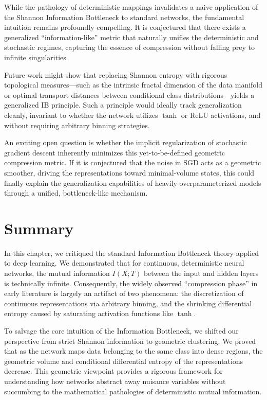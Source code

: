 \begin{horizon}
While the pathology of deterministic mappings invalidates a naive application of the Shannon Information Bottleneck to standard networks, the fundamental intuition remains profoundly compelling. It is conjectured that there exists a generalized ``information-like'' metric that naturally unifies the deterministic and stochastic regimes, capturing the essence of compression without falling prey to infinite singularities. 

Future work might show that replacing Shannon entropy with rigorous topological measures---such as the intrinsic fractal dimension of the data manifold or optimal transport distances between conditional class distributions---yields a generalized IB principle. Such a principle would ideally track generalization cleanly, invariant to whether the network utilizes $\tanh$ or ReLU activations, and without requiring arbitrary binning strategies.

An exciting open question is whether the implicit regularization of stochastic gradient descent inherently minimizes this yet-to-be-defined geometric compression metric. If it is conjectured that the noise in SGD acts as a geometric smoother, driving the representations toward minimal-volume states, this could finally explain the generalization capabilities of heavily overparameterized models through a unified, bottleneck-like mechanism.
\end{horizon}

\section{Summary}
In this chapter, we critiqued the standard Information Bottleneck theory applied to deep learning. We demonstrated that for continuous, deterministic neural networks, the mutual information $I(X; T)$ between the input and hidden layers is technically infinite. Consequently, the widely observed ``compression phase'' in early literature is largely an artifact of two phenomena: the discretization of continuous representations via arbitrary binning, and the shrinking differential entropy caused by saturating activation functions like $\tanh$. 

To salvage the core intuition of the Information Bottleneck, we shifted our perspective from strict Shannon information to geometric clustering. We proved that as the network maps data belonging to the same class into dense regions, the geometric volume and conditional differential entropy of the representations decrease. This geometric viewpoint provides a rigorous framework for understanding how networks abstract away nuisance variables without succumbing to the mathematical pathologies of deterministic mutual information.

